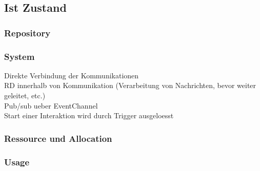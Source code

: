 \subsection{Ist Zustand}
\subsubsection{Repository}
\subsubsection{System}
Direkte Verbindung der Kommunikationen \\
RD innerhalb von Kommunikation (Verarbeitung von Nachrichten, bevor weiter geleitet, etc.)\\
Pub/sub ueber EventChannel \\
Start einer Interaktion wird durch Trigger ausgeloesst \\
\subsubsection{Ressource und Allocation}
\subsubsection{Usage}
